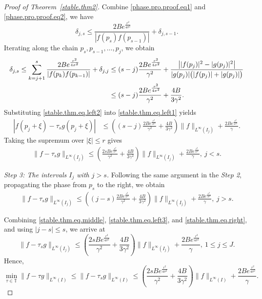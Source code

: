 \documentclass[10pt,a4paper]{amsart}
\begin{document}
\begin{proof}[Proof of Theorem~\ref{stable.thm2}]
Combine \eqref{phase.pro.proof.eq1} and \eqref{phase.pro.proof.eq2}, we have 
$$\delta_{j,s} \le \frac{2Be^{\frac{r^2}{4\sigma^2}}}{|f(p_s)f(p_{s-1})|} +
\delta_{j,s-1}.$$ 
Iterating  along the chain  $p_s,p_{s-1},\dots,p_j$, 
we obtain
\begin{align}\label{stable.thm.eq.left2}
\delta_{j,s}\le \sum_{k=j+1}^s \frac{2Be^{\frac{r^2}{4\sigma^2}}}{|f(p_k)f(p_{k-1})|} +\delta_{j ,j}&\le (s-j)\frac{2Be^{\frac{r^2}{4\sigma^2}}}{\gamma^2}   
+\frac{\bigl||f(p_j)|^2-|g(p_j)|^2\bigr|}{|g(p_j)|\bigl(|f(p_j)|+|g(p_j)|\bigr)} \notag\\
& \le (s-j)\frac{2Be^{\frac{r^2}{4\sigma^2}}}{\gamma^2}
+ \frac{4B}{3\gamma^2}.
\end{align}
Substituting \eqref{stable.thm.eq.left2} into \eqref{stable.thm.eq.left1} yields
\begin{align*}
|f(p_j+\xi)-\tau_s g(p_j+\xi)| &\le \left( (s-j)\frac{2Be^{\frac{r^2}{4\sigma^2}}}{\gamma^2} +\frac{4B}{3\gamma^2}\right)\|f\|_{L^\infty(I_j)}
+\frac{2Be^{\frac{r^2}{4\sigma^2}}}{\gamma}. 
\end{align*}
Taking the supremum over $|\xi|\le r$ gives
\begin{align}\label{stable.thm.eq.left3}
    \|f-\tau_s g\|_{L^\infty(I_j)} \le \left( \frac{2sBe^{\frac{r^2}{4\sigma^2}}}{\gamma^2}
+ \frac{4B}{3\gamma^2} \right) \|f\|_{L^\infty(I_j)} + \frac{2Be^{\frac{r^2}{4\sigma^2}}}{\gamma}, \  j<s.
\end{align}


\medskip
\noindent
\emph{Step 3: The intervals \(I_j\) with \(j>s\).}
Following the same argument in the \emph{Step 2}, propagating the phase from $p_s$ to the right, we obtain
\begin{align}\label{stable.thm.eq.right}
\|f-\tau_s g\|_{L^\infty(I_j)} \le \left( (j-s)\frac{2Be^{\frac{r^2}{4\sigma^2}}}{\gamma^2}
+ \frac{4B}{3\gamma^2} \right) \|f\|_{L^\infty(I_j)} + \frac{2Be^{\frac{r^2}{4\sigma^2}}}{\gamma}, \  j>s.
\end{align}

Combining \eqref{stable.thm.eq.middle}, \eqref{stable.thm.eq.left3}, and
\eqref{stable.thm.eq.right}, and using $|j-s|\le s$, we arrive at
\begin{equation*}
\|f-\tau_s g\|_{L^\infty(I_j)} \le \left( \frac{2sBe^{\frac{r^2}{4\sigma^2}}}{\gamma^2}
+ \frac{4B}{3\gamma^2} \right)\|f\|_{L^\infty(I_j)} + \frac{2Be^{\frac{r^2}{4\sigma^2}}}{\gamma},
\ 1\le j\le J.
\end{equation*}
Hence,
\begin{equation}\label{stable.thm.eq.case1}
\min_{\tau\in\mathbb T}\|f-\tau g\|_{L^\infty(I)} \le \|f-\tau_s g\|_{L^\infty(I)} \le \left( \frac{2sBe^{\frac{r^2}{4\sigma^2}}}{\gamma^2} +
\frac{4B}{3\gamma^2} \right)\|f\|_{L^\infty(I)} + \frac{2Be^{\frac{r^2}{4\sigma^2}}}{\gamma}.
\end{equation}


\end{proof}
\end{document}
